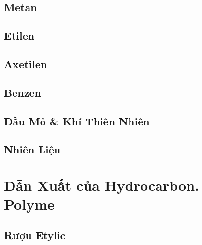 \documentclass{article}
\numberwithin{equation}{section}
\begin{document}

\subsection{Metan}


\subsection{Etilen}


\subsection{Axetilen}


\subsection{Benzen}


\subsection{Dầu Mỏ \& Khí Thiên Nhiên}


\subsection{Nhiên Liệu}


\section{Dẫn Xuất của Hydrocarbon. Polyme}

\subsection{Rượu Etylic}
\end{document}
